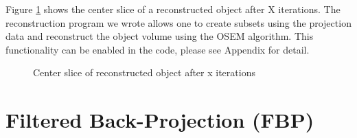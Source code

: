 Figure \ref{fig:reconstructedimage} shows the center slice of a reconstructed object after X iterations.  The reconstruction program we wrote allows one to create subsets using the projection data and reconstruct the object volume using the OSEM algorithm.  This functionality can be enabled in the code, please see Appendix for detail.

\begin{figure}
\centering
{}
\label{fig:reconstructedimage}
\caption{Center slice of reconstructed object after x iterations}
\end{figure}

\section{Filtered Back-Projection (FBP) }


